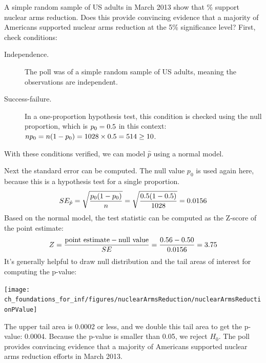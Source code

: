 \begin{examplewrap}
\begin{nexample}{A simple random sample of
    \gallupnucleararmspollsize{} US adults
    in March 2013 show that
    \gallupnucleararmspollpercent{}\% support nuclear arms
    reduction.
    Does this provide convincing evidence that a majority
    of Americans supported nuclear arms reduction at the
    5\% significance level?} \label{NuclearArmsInferenceExample}
  First, check conditions:
  \begin{description}
  \item[Independence.] The poll was of a simple random sample
      of US adults, meaning the observations are independent.
  \item[Success-failure.] In a one-proportion hypothesis test,
      this condition is checked using the null proportion,
      which is $p_0 = 0.5{}$
      in this context:
      $n p_0 = n (1 - p_0)
          = 1028{} \times
              0.5{}
          = 514{} \geq 10$.
  \end{description}
  With these conditions verified,
  we can model $\hat{p}$ using a normal model.

  Next the standard error can be computed.
  The null value $p_0$ is used again here,
  because this is a hypothesis test for a single proportion.
  \begin{align*}
  SE_{\hat{p}}
      = \sqrt{\frac{p_0 (1 - p_0)}{n}}
      = \sqrt{\frac{0.5{}
          (1 - 0.5{})}
          {1028{}}}
      = 0.0156{}
  \end{align*}
  Based on the normal model, the test statistic can be
  computed as the Z-score of the point estimate:
  \begin{align*}
  Z = \frac{\text{point estimate} - \text{null value}}{SE}
      = \frac{0.56{} - 0.50}
          {0.0156{}}
      = 3.75
  \end{align*}
  It's generally helpful to draw null distribution and
  the tail areas of interest for computing the p-value:
  \begin{center}
  \texttt{[image: ch\_foundations\_for\_inf/figures/nuclearArmsReduction/nuclearArmsReductionPValue]}
  \end{center}
  The upper tail area is 0.0002 or less,
  and we double this tail area to get the p-value: 0.0004.
  Because the p-value is smaller than 0.05, we reject $H_0$.
  The poll provides convincing evidence that a majority
  of Americans supported nuclear arms reduction efforts
  in March 2013.
\end{nexample}
\end{examplewrap}

